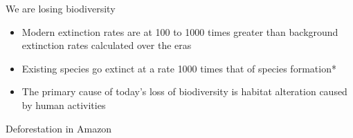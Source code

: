 
{
	\begin{frame}[t]{We are losing biodiversity}
	\begin{itemize}
		\item Modern extinction rates are at \alert{100} to \alert{1000} times greater than background extinction rates calculated over the eras \cite{hambler2004extinction}
		\item Existing species go extinct at a rate \alert{1000} times that of species formation*
		\item The primary cause of today's loss of biodiversity is \alert{habitat alteration caused by human activities}
	\end{itemize}	
\end{frame}
}

{
	\begin{frame}{Deforestation in Amazon}
	\centering
\end{frame}
}